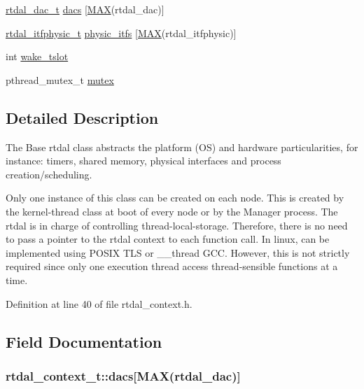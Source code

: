 \begin{DoxyCompactItemize}
\item 
\hyperlink{structrtdal__dac__t}{rtdal\-\_\-dac\-\_\-t} \hyperlink{structrtdal__context__t_ae5e9258b89efd6790a20c761a6e12a35}{dacs} \mbox{[}\hyperlink{objects__max_8h_a5ec0a30768a338a08d7e0c296475a2cf}{M\-A\-X}(rtdal\-\_\-dac)\mbox{]}
\item 
\hyperlink{structrtdal__itfphysic__t}{rtdal\-\_\-itfphysic\-\_\-t} \hyperlink{structrtdal__context__t_a98f27c3f5224b9558e25106b4b0822e2}{physic\-\_\-itfs} \mbox{[}\hyperlink{objects__max_8h_a5ec0a30768a338a08d7e0c296475a2cf}{M\-A\-X}(rtdal\-\_\-itfphysic)\mbox{]}
\item 
int \hyperlink{structrtdal__context__t_abfb7860ff2fbfc31358676c27ec2fbce}{wake\-\_\-tslot}
\item 
pthread\-\_\-mutex\-\_\-t \hyperlink{structrtdal__context__t_a3d973ad68e1ace5e912e2d0c5486be0d}{mutex}
\end{DoxyCompactItemize}


\subsection{Detailed Description}
The Base rtdal class abstracts the platform (O\-S) and hardware particularities, for instance\-: timers, shared memory, physical interfaces and process creation/scheduling.

Only one instance of this class can be created on each node. This is created by the kernel-\/thread class at boot of every node or by the Manager process. The rtdal is in charge of controlling thread-\/local-\/storage. Therefore, there is no need to pass a pointer to the rtdal context to each function call. In linux, can be implemented using P\-O\-S\-I\-X T\-L\-S or \-\_\-\-\_\-thread G\-C\-C. However, this is not strictly required since only one execution thread access thread-\/sensible functions at a time. 

Definition at line 40 of file rtdal\-\_\-context.\-h.



\subsection{Field Documentation}
\hypertarget{structrtdal__context__t_ae5e9258b89efd6790a20c761a6e12a35}{
\subsubsection[{dacs}]{ rtdal\-\_\-context\-\_\-t\-::dacs\mbox{[}{\bf M\-A\-X}(rtdal\-\_\-dac)\mbox{]}}}\label{structrtdal__context__t_ae5e9258b89efd6790a20c761a6e12a35}


